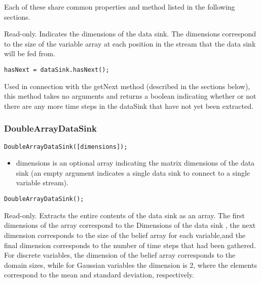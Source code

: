 Each of these share common properties and method listed in the following sections.



Read-only.  Indicates the dimensions of the data sink.  The dimensions correspond to the size of the variable array at each position in the stream that the data sink will be fed from.



\begin{lstlisting}
hasNext = dataSink.hasNext();
\end{lstlisting}

Used in connection with the getNext method (described in the sections below), this method takes no arguments and returns a boolean indicating whether or not there are any more time steps in the dataSink that have not yet been extracted.



\subsubsection{DoubleArrayDataSink}

\ifmatlab
\begin{lstlisting}
DoubleArrayDataSink([dimensions]);
\end{lstlisting}

\begin{itemize}
\item dimensions is an optional array indicating the matrix dimensions of the data sink (an empty argument indicates a single data sink to connect to a single variable stream).
\end{itemize}
\fi

\ifjava
\begin{lstlisting}
DoubleArrayDataSink();
\end{lstlisting}
\fi




Read-only.  Extracts the entire contents of the data sink as an array.  The first dimensions of the array correspond to the Dimensions of the data sink \ifmatlab, the next dimension corresponds to the size of the belief array for each variable,\fi and the final dimension corresponds to the number of time steps that had been gathered.  For discrete variables, the dimension of the belief array corresponds to the domain sizes, while for Gaussian variables the dimension is 2, where the elements correspond to the mean and standard deviation, respectively.



